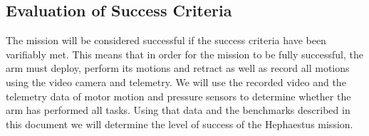 \documentclass[letterpaper,10pt]{article}
\begin{document}
\subsection{Evaluation of Success Criteria}
The mission will be considered successful if the success criteria have been
varifiably met. This means that in order for the mission to be fully successful,
the arm must deploy, perform its motions and retract as well as record all
motions using the video camera and telemetry. We will use the recorded video and
the telemetry data of motor motion and pressure sensors to determine whether the
arm has performed all tasks. Using that data and the benchmarks described in
this document we will determine the level of success of the Hephaestus mission.
\end{document}
